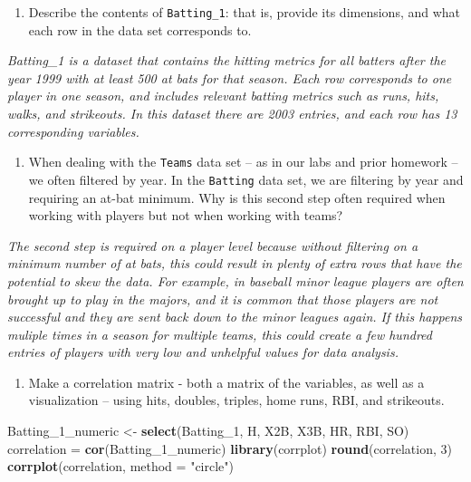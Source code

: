 \documentclass[]{article}
\newenvironment{Shaded}{\begin{snugshade}}{\end{snugshade}}
\newcommand{\DataTypeTok}[1]{\textcolor[rgb]{0.13,0.29,0.53}{#1}}
\newcommand{\DecValTok}[1]{\textcolor[rgb]{0.00,0.00,0.81}{#1}}
\newcommand{\KeywordTok}[1]{\textcolor[rgb]{0.13,0.29,0.53}{\textbf{#1}}}
\newcommand{\NormalTok}[1]{#1}
\newcommand{\StringTok}[1]{\textcolor[rgb]{0.31,0.60,0.02}{#1}}
\providecommand{\tightlist}{%
  \setlength{\itemsep}{0pt}\setlength{\parskip}{0pt}}
\begin{document}
\begin{enumerate}
\def\labelenumi{\arabic{enumi}.}
\tightlist
\item
  Describe the contents of \texttt{Batting\_1}: that is, provide its
  dimensions, and what each row in the data set corresponds to.
\end{enumerate}

\emph{Batting\_1 is a dataset that contains the hitting metrics for all
batters after the year 1999 with at least 500 at bats for that season.
Each row corresponds to one player in one season, and includes relevant
batting metrics such as runs, hits, walks, and strikeouts. In this
dataset there are 2003 entries, and each row has 13 corresponding
variables.}

\begin{enumerate}
\def\labelenumi{\arabic{enumi}.}
\setcounter{enumi}{1}
\tightlist
\item
  When dealing with the \texttt{Teams} data set -- as in our labs and
  prior homework -- we often filtered by year. In the \texttt{Batting}
  data set, we are filtering by year and requiring an at-bat minimum.
  Why is this second step often required when working with players but
  not when working with teams?
\end{enumerate}

\emph{The second step is required on a player level because without
filtering on a minimum number of at bats, this could result in plenty of
extra rows that have the potential to skew the data. For example, in
baseball minor league players are often brought up to play in the
majors, and it is common that those players are not successful and they
are sent back down to the minor leagues again. If this happens muliple
times in a season for multiple teams, this could create a few hundred
entries of players with very low and unhelpful values for data
analysis.}

\begin{enumerate}
\def\labelenumi{\arabic{enumi}.}
\setcounter{enumi}{2}
\tightlist
\item
  Make a correlation matrix - both a matrix of the variables, as well as
  a visualization -- using hits, doubles, triples, home runs, RBI, and
  strikeouts.
\end{enumerate}

\begin{Shaded}
\begin{Highlighting}[]
\NormalTok{Batting_}\DecValTok{1}\NormalTok{_numeric <-}\StringTok{ }\KeywordTok{select}\NormalTok{(Batting_}\DecValTok{1}\NormalTok{, H, X2B, X3B, HR, RBI, SO)}
\NormalTok{correlation =}\StringTok{ }\KeywordTok{cor}\NormalTok{(Batting_}\DecValTok{1}\NormalTok{_numeric)}
\KeywordTok{library}\NormalTok{(corrplot)}
\KeywordTok{round}\NormalTok{(correlation, }\DecValTok{3}\NormalTok{)}
\KeywordTok{corrplot}\NormalTok{(correlation, }\DataTypeTok{method =} \StringTok{"circle"}\NormalTok{)}
\end{Highlighting}
\end{Shaded}
\end{document}
